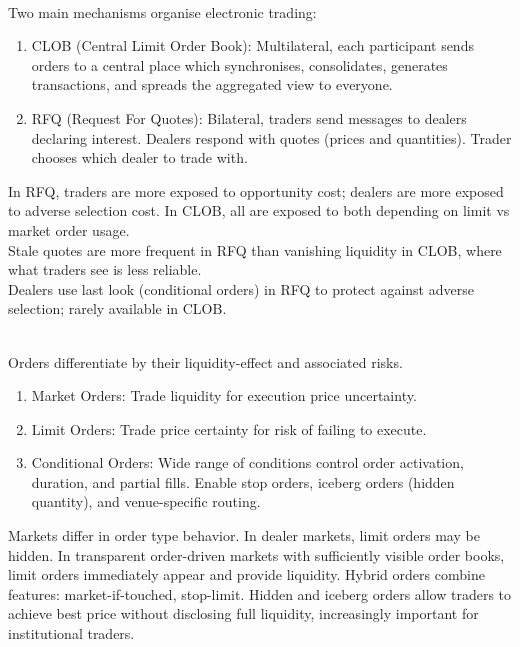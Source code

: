 \begin{remark} \\
Two main mechanisms organise electronic trading:
\begin{enumerate}[label=\roman*.]
\setlength{\itemsep}{0pt}
\item CLOB (Central Limit Order Book): Multilateral, each participant sends orders to a central place which synchronises, consolidates, generates transactions, and spreads the aggregated view to everyone. 
\item RFQ (Request For Quotes): Bilateral, traders send messages to dealers declaring interest. Dealers respond with quotes (prices and quantities). Trader chooses which dealer to trade with.
\end{enumerate}
In RFQ, traders are more exposed to opportunity cost; dealers are more exposed to adverse selection cost. In CLOB, all are exposed to both depending on limit vs market order usage.\\
Stale quotes are more frequent in RFQ than vanishing liquidity in CLOB, where what traders see is less reliable.\\
Dealers use last look (conditional orders) in RFQ to protect against adverse selection; rarely available in CLOB.
\end{remark}

\begin{remark} \\
Orders differentiate by their liquidity-effect and associated risks.
\begin{enumerate}[label=\roman*.]
\setlength{\itemsep}{0pt}
\item Market Orders: Trade liquidity for execution price uncertainty.
\item Limit Orders: Trade price certainty for risk of failing to execute.
\item Conditional Orders: Wide range of conditions control order activation, duration, and partial fills. Enable stop orders, iceberg orders (hidden quantity), and venue-specific routing.
\end{enumerate}
Markets differ in order type behavior. In dealer markets, limit orders may be hidden. In transparent order-driven markets with sufficiently visible order books, limit orders immediately appear and provide liquidity. Hybrid orders combine features: market-if-touched, stop-limit. Hidden and iceberg orders allow traders to achieve best price without disclosing full liquidity, increasingly important for institutional traders.
\end{remark}

